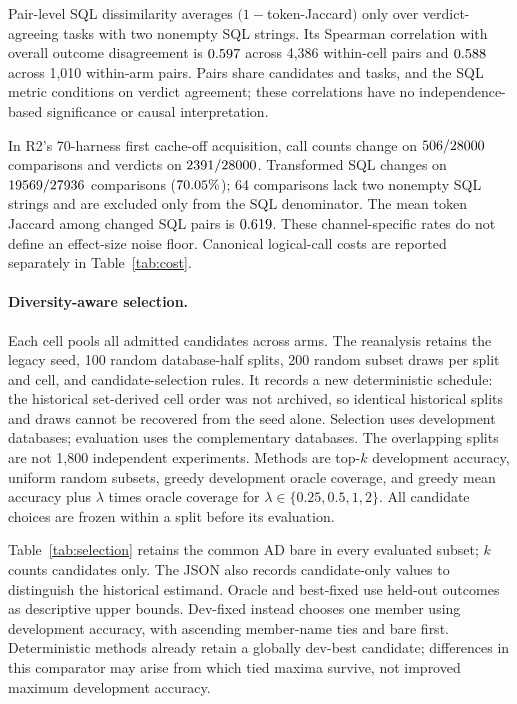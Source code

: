 Pair-level SQL dissimilarity averages $(1-$token-Jaccard$)$ only over
verdict-agreeing tasks with two nonempty SQL strings. Its Spearman
correlation with overall outcome disagreement is $0.597$
across 4{,}386 within-cell pairs and $0.588$ across
1{,}010 within-arm pairs. Pairs share candidates and tasks, and the SQL
metric conditions on verdict agreement; these correlations have no
independence-based significance or causal interpretation.

In R2's 70-harness first cache-off acquisition, call counts change on
$506/28000$ comparisons and verdicts on
$2391/28000$. Transformed SQL changes on
$19569/27936$ comparisons
($70.05\%$); 64 comparisons lack two nonempty SQL
strings and are excluded only from the SQL denominator. The mean token
Jaccard among changed SQL pairs is $0.619$. These
channel-specific rates do not define an effect-size noise floor.
Canonical logical-call costs are reported separately in Table~\ref{tab:cost}.

\paragraph{Diversity-aware selection.} Each cell pools all admitted
candidates across arms. The reanalysis retains the legacy seed, 100
random database-half splits, 200 random subset draws per split and cell,
and candidate-selection rules. It records a new deterministic schedule:
the historical set-derived cell order was not archived, so identical
historical splits and draws cannot be recovered from the seed alone.
Selection uses development databases; evaluation uses the complementary
databases. The overlapping splits are not 1{,}800 independent experiments.
Methods are top-$k$ development accuracy, uniform random subsets, greedy
development oracle coverage, and greedy mean accuracy plus
$\lambda$ times oracle coverage for $\lambda\in\{0.25,0.5,1,2\}$.
All candidate choices are frozen within a split before its evaluation.

Table~\ref{tab:selection} retains the common AD bare in every evaluated
subset; $k$ counts candidates only. The JSON also records candidate-only
values to distinguish the historical estimand. Oracle and best-fixed use
held-out outcomes as descriptive upper bounds. Dev-fixed instead chooses
one member using development accuracy, with ascending member-name ties
and bare first. Deterministic methods already retain a globally dev-best
candidate; differences in this comparator may arise from which tied
maxima survive, not improved maximum development accuracy.

